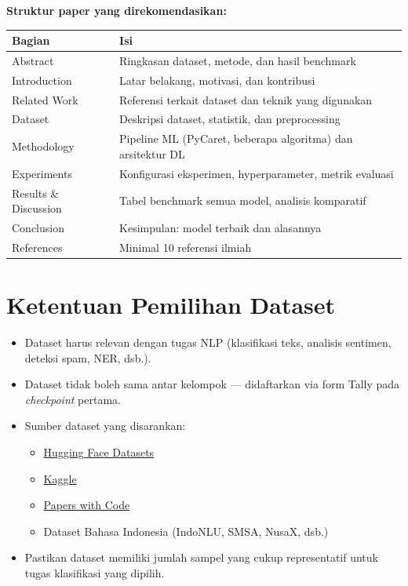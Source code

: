 \documentclass[11pt,a4paper]{article}
\begin{document}
\textbf{Struktur paper yang direkomendasikan:}

\begin{center}
\begin{tabular}{lp{9cm}}
\toprule
\textbf{Bagian} & \textbf{Isi} \\
\midrule
Abstract & Ringkasan dataset, metode, dan hasil benchmark \\
Introduction & Latar belakang, motivasi, dan kontribusi \\
Related Work & Referensi terkait dataset dan teknik yang digunakan \\
Dataset & Deskripsi dataset, statistik, dan preprocessing \\
Methodology & Pipeline ML (PyCaret, beberapa algoritma) dan arsitektur DL \\
Experiments & Konfigurasi eksperimen, hyperparameter, metrik evaluasi \\
Results \& Discussion & Tabel benchmark semua model, analisis komparatif \\
Conclusion & Kesimpulan: model terbaik dan alasannya \\
References & Minimal 10 referensi ilmiah \\
\bottomrule
\end{tabular}
\end{center}

\section{Ketentuan Pemilihan Dataset}

\begin{itemize}
  \item Dataset harus relevan dengan tugas NLP (klasifikasi teks, analisis sentimen, deteksi spam, NER, dsb.).
  \item Dataset tidak boleh sama antar kelompok --- didaftarkan via form Tally pada \textit{checkpoint} pertama.
  \item Sumber dataset yang disarankan:
  \begin{itemize}
    \item \href{https://huggingface.co/datasets}{Hugging Face Datasets}
    \item \href{https://www.kaggle.com/datasets}{Kaggle}
    \item \href{https://paperswithcode.com/datasets}{Papers with Code}
    \item Dataset Bahasa Indonesia (IndoNLU, SMSA, NusaX, dsb.)
  \end{itemize}
  \item Pastikan dataset memiliki jumlah sampel yang cukup representatif untuk tugas klasifikasi yang dipilih.
\end{itemize}
\end{document}
